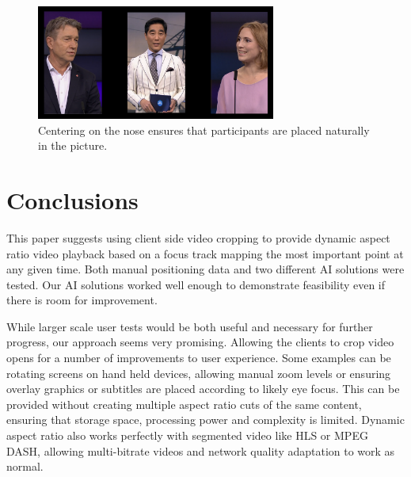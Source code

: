 \documentclass[sigconf, review=false]{acmart}
\begin{document}
\begin{figure}
\begin{center}
\includegraphics[width=0.7\textwidth]{nose_center.png}
\caption{Centering on the nose ensures that participants are placed naturally
 in the picture.}
\label{nose_center}
\end{center}
\end{figure}



\section{Conclusions}

This paper suggests using client side video cropping to provide dynamic aspect
ratio video playback based on a focus track mapping the most important point
at any given time. Both manual positioning data and two different AI
solutions were tested. Our AI solutions worked well enough to demonstrate
feasibility even if there is room for improvement.

While larger scale user tests would be both useful and necessary for further
progress, our approach seems very promising. Allowing the clients to crop
video opens for a number of improvements to user experience. Some examples
can be rotating screens on hand held devices, allowing manual zoom levels or
ensuring overlay graphics or subtitles are placed according to likely eye
focus. This can be provided without creating multiple aspect ratio cuts of
the same content, ensuring that storage space, processing power and
complexity is limited. Dynamic aspect ratio also works perfectly with
segmented video like HLS or MPEG DASH, allowing multi-bitrate videos and
network quality adaptation to work as normal. 
\end{document}
